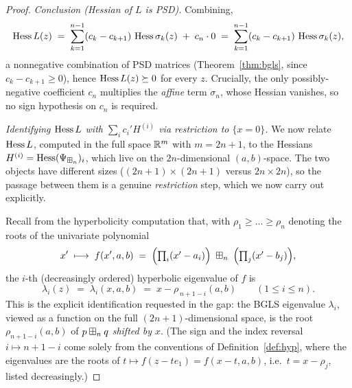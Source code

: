 \begin{proof}
\smallskip\noindent\textit{Conclusion (Hessian of $L$ is PSD).} Combining,
\[
\operatorname{Hess} L(z)
\;=\;\sum_{k=1}^{n-1}(c_k-c_{k+1})\,\operatorname{Hess}\sigma_k(z)\;+\;c_n\cdot0
\;=\;\sum_{k=1}^{n-1}(c_k-c_{k+1})\,\operatorname{Hess}\sigma_k(z),
\]
a nonnegative combination of PSD matrices (Theorem~\ref{thm:bgls}, since
$c_k-c_{k+1}\ge0$), hence $\operatorname{Hess} L(z)\succeq 0$ for every $z$. Crucially, the
only possibly-negative coefficient $c_n$ multiplies the \emph{affine} term
$\sigma_n$, whose Hessian vanishes, so no sign hypothesis on $c_n$ is required.

\smallskip\noindent\textit{Identifying $\operatorname{Hess} L$ with $\sum_i c_i' H^{(i)}$ via restriction to $\{x=0\}$.}
We now relate $\operatorname{Hess} L$, computed in the full space $\mathbb{R}^m$ with
$m=2n+1$, to the Hessians $H^{(i)}=\operatorname{Hess}(\Psi_{\boxplus_n})_i$, which live on the
$2n$-dimensional $(a,b)$-space. The two objects have different sizes
($(2n{+}1)\times(2n{+}1)$ versus $2n\times2n$), so the passage between them is a
genuine \emph{restriction} step, which we now carry out explicitly.

Recall from the hyperbolicity computation that, with $\rho_1\ge\dots\ge\rho_n$
denoting the roots of the univariate polynomial
\[
x'\;\longmapsto\;f(x',a,b)\;=\;\Bigl(\textstyle\prod_i(x'-a_i)\Bigr)\;\boxplus_n\;
\Bigl(\textstyle\prod_j(x'-b_j)\Bigr),
\]
the $i$-th (decreasingly ordered) hyperbolic eigenvalue of $f$ is
\begin{equation}\label{eq:lambda-eq-rho}
\lambda_i(z)\;=\;\lambda_i(x,a,b)\;=\;x-\rho_{\,n+1-i}(a,b)\qquad(1\le i\le n).
\end{equation}
This is the explicit identification requested in the gap: the BGLS eigenvalue
$\lambda_i$, viewed as a function on the full $(2n{+}1)$-dimensional space, is
the root $\rho_{n+1-i}(a,b)$ of $p\boxplus_n q$ \emph{shifted by $x$}. (The sign
and the index reversal $i\mapsto n+1-i$ come solely from the conventions of
Definition~\ref{def:hyp}, where the eigenvalues are the roots of
$t\mapsto f(z-te_1)=f(x-t,a,b)$, i.e.\ $t=x-\rho_j$, listed decreasingly.)


\end{proof}
